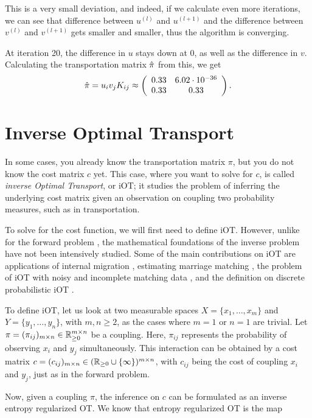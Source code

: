 \begin{example}
	This is a very small deviation, and indeed, if we calculate even more iterations, we can see that difference between $u^{(l)}$ and $u^{(l+1)}$ and the difference between $v^{(l)}$ and $v^{(l+1)}$ gets smaller and smaller, thus the algorithm is converging.\par 
	At iteration 20, the difference in $u$ stays down at $0$, as well as the difference in $v$. Calculating the transportation matrix $\hat{\pi}$ from this, we get 
	\[ \hat{\pi} = u_i v_j K_{ij} \approx \left(\begin{array}{cc}
		0.33 & 6.02 \cdot 10^{-36} \\
		0.33 & 0.33
	\end{array}\right) .  \]
\end{example}

\section{Inverse Optimal Transport}
In some cases, you already know the transportation matrix $\pi$, but you do not know the cost matrix $c$ yet. This case, where you want to solve for $c$, is called \textit{inverse Optimal Transport}, or iOT; it studies the problem of inferring the underlying cost matrix given an observation on coupling two probability measures, such as in transportation. \par 
To solve for the cost function, we will first need to define iOT. However, unlike for the forward problem \citep{villani2008}, the mathematical foundations of the inverse problem have not been intensively studied. Some of the main contributions on iOT are applications of internal migration \citep{stuart2020}, estimating marriage matching \citep{ma2021}, the problem of iOT with noisy and incomplete matching data \citep{li2019}, and the definition on discrete probabilistic iOT \citep{chiu2022}. \par 
To define iOT, let us look at two measurable spaces $X = \{x_1, \dots, x_m\}$ and $Y = \{y_1, \dots, y_n\}$, with $m, n \geq 2$, as the cases where $m=1$ or $n=1$ are trivial. Let $\pi = (\pi_{ij})_{m \times n} \in \mathbb{R}_{\geq 0}^{m \times n}$ be a coupling. Here, $\pi_{ij}$ represents the probability of observing $x_i$ and $y_j$ simultaneously. This interaction can be obtained by a cost matrix $c = (c_{ij})_{m \times n} \in (\mathbb{R}_{\geq 0} \cup \{\infty\})^{m \times n}$, with $c_{ij}$ being the cost of coupling $x_i$ and $y_j$, just as in the forward problem. \par 
Now, given a coupling $\pi$, the inference on $c$ can be formulated as an inverse entropy regularized OT. We know that entropy regularized OT is the map 
